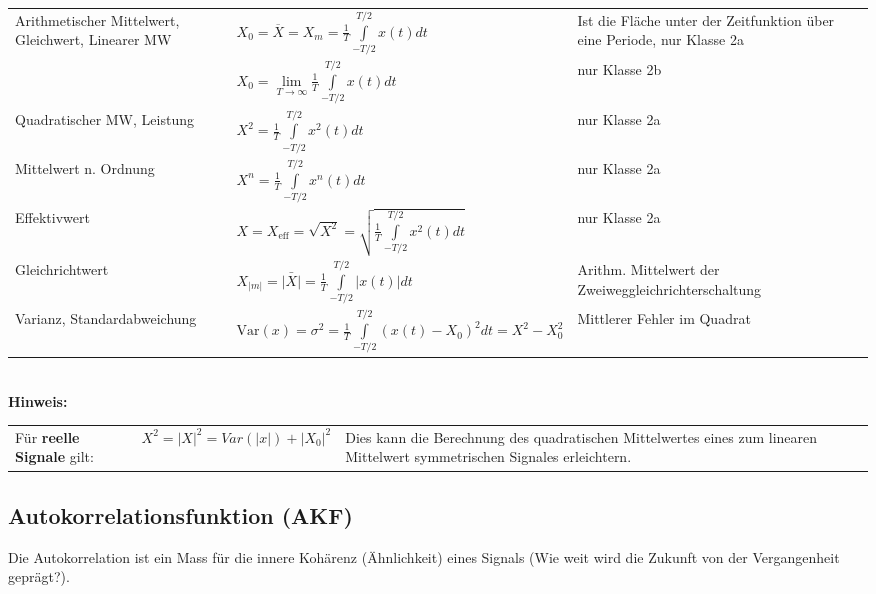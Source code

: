 		\begin{tabularx}{\textwidth}{p{4.7cm}p{8.1cm}X}
			Arithmetischer Mittelwert, Gleichwert, Linearer MW
		&	$X_0 = \overline{X} = X_m = \frac {1} {T} \int\limits_{-T/2}^{T/2} x(t)dt$
		&	Ist die Fläche unter der Zeitfunktion über eine Periode, nur Klasse 2a
		\\
		    {}
		&   $X_0 = \lim\limits_{T\rightarrow \infty}{\frac {1} {T} \int\limits_{-T/2}^{T/2} x(t)dt}$
		&   nur Klasse 2b
		\\
			Quadratischer MW, Leistung
		&	$X^2 = \frac {1} {T} \int\limits_{-T/2}^{T/2} x^2(t)dt$
		& 	nur Klasse 2a
		\\
			Mittelwert n. Ordnung
		&	$X^n = \frac {1} {T} \int\limits_{-T/2}^{T/2} x^n(t)dt$
		& 	nur Klasse 2a
		\\
			Effektivwert
		&	$X = X_{\text{eff}}= \sqrt{X^2} = \sqrt{\frac{1}{T} \int\limits_{-T/2}^{T/2}{x^2(t)dt}}$
		&	nur Klasse 2a
		\\
			Gleichrichtwert
		&	$X_{|m|} = \bar{|X|} = \frac{1}{T} \int\limits_{-T/2}^{T/2}{|x(t)| dt}$
		&	Arithm. Mittelwert der Zweiweggleichrichterschaltung
	    \\
			Varianz, Standardabweichung
		&	$\text{Var}(x)=\sigma^2= \frac {1} {T} \int\limits_{-T/2}^{T/2}(x(t)-X_0)^2dt = X^2-X_0^2$
		&	Mittlerer Fehler im Quadrat
		\\
		\end{tabularx} \\
	
		\textbf{Hinweis:} \\
		\begin{tabularx}{\textwidth}{llX}
			Für \textbf{reelle Signale} gilt: &
			$ X^2 = |X|^2 = Var(|x|) + |X_0|^2 $ &
			Dies kann die Berechnung des quadratischen Mittelwertes eines zum linearen Mittelwert symmetrischen Signales erleichtern.
		\end{tabularx}
		
		
	\subsection{Autokorrelationsfunktion (AKF) } 
	Die Autokorrelation ist ein Mass für die innere Kohärenz (Ähnlichkeit) eines Signals (Wie weit wird die Zukunft von der Vergangenheit geprägt?).
	
